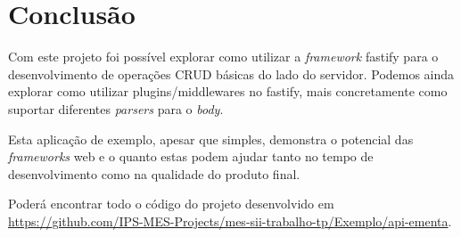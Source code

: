 \section{Conclusão} \label{section: conclusion}

Com este projeto foi possível explorar como utilizar a \textit{framework} fastify para o desenvolvimento de operações CRUD básicas do lado do servidor. Podemos ainda explorar como utilizar plugins/middlewares no fastify, mais concretamente como suportar diferentes \textit{parsers} para o \textit{body}.

Esta aplicação de exemplo, apesar que simples, demonstra o potencial das \textit{frameworks} web e o quanto estas podem ajudar tanto no tempo de desenvolvimento como na qualidade do produto final.

Poderá encontrar todo o código do projeto desenvolvido em \url{https://github.com/IPS-MES-Projects/mes-sii-trabalho-tp/Exemplo/api-ementa}.